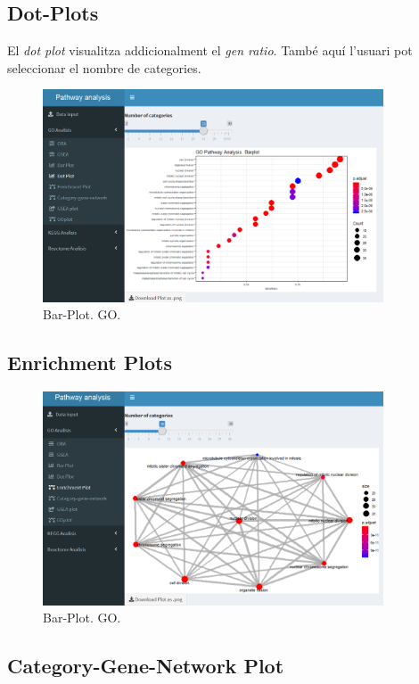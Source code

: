 \documentclass[]{article}
\begin{document}
\subsection{Dot-Plots}

El \textit{dot plot} visualitza addicionalment el \textit{gen ratio}. També aquí l'usuari pot seleccionar el nombre de categories.


\begin{figure}[H]
\centering
\includegraphics[width=0.9\textwidth]{App_F15_Items_GO_DotPlot.png} 
\caption{Bar-Plot. GO.}
\end{figure}

\subsection{Enrichment Plots}

\begin{figure}[H]
\centering
\includegraphics[width=0.9\textwidth]{App_F16_Items_GO_Emap.png} 
\caption{Bar-Plot. GO.}
\end{figure}

\subsection{Category-Gene-Network Plot}
\end{document}
